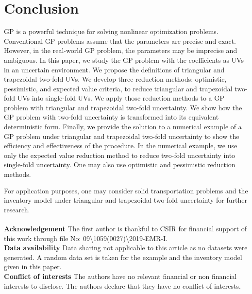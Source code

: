 \section{Conclusion}\label{sec.6}
GP is a powerful technique for solving nonlinear optimization problems. Conventional GP problems assume that the parameters are precise and exact. However, in the real-world GP problem, the parameters may be imprecise and ambiguous. In this paper, we study the GP problem with the coefficients as UVs in an uncertain environment. We propose the definitions of triangular and trapezoidal two-fold UVs. We develop three reduction methods: optimistic, pessimistic, and expected value criteria, to reduce triangular and trapezoidal two-fold UVs into single-fold UVs. We apply those reduction methods to a GP problem with triangular and trapezoidal two-fold uncertainty. We show how the GP problem with two-fold uncertainty is transformed into its equivalent deterministic form. Finally, we provide the solution to a numerical example of a GP problem under triangular and trapezoidal two-fold uncertainty to show the efficiency and effectiveness of the procedure. In the numerical example, we use only the expected value reduction method to reduce two-fold uncertainty into single-fold uncertainty. One may also use optimistic and pessimistic reduction methods.
\par For application purposes, one may consider solid transportation problems and the inventory model under triangular and trapezoidal two-fold uncertainty for further research. \\\\
{\small \textbf{Acknowledgement }The first author is thankful to CSIR for financial support of this work through file No: 09\textbackslash 1059(0027)\textbackslash 2019-EMR-I.}
\\
\textbf{Data availability } Data sharing not applicable to this article as no datasets were generated. A random data set is taken for the example and the inventory model given in this paper.\\
\textbf{Conflict of interests} The authors have no relevant financial or non financial interests to disclose. The authors
declare that they have no conflict of interests.
